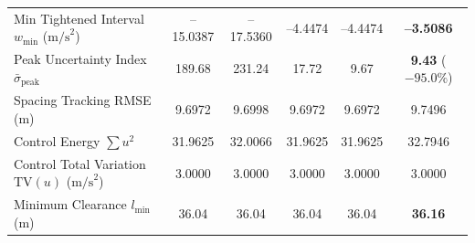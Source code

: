 \documentclass[journal]{IEEEtran}
\begin{document}
\begin{table}[t]
\begin{tabular}{lccccc}
Min Tightened Interval $w_{\min}$ ($\text{m/s}^2$) & --15.0387 & --17.5360 & --4.4474 & --4.4474 & \textbf{--3.5086} \\
Peak Uncertainty Index $\bar\sigma_{\mathrm{peak}}$ & 189.68 & 231.24 & 17.72 & 9.67 & \textbf{9.43} ($-95.0\%$) \\
Spacing Tracking RMSE (m) & 9.6972 & 9.6998 & 9.6972 & 9.6972 & 9.7496 \\
Control Energy $\sum u^2$ & 31.9625 & 32.0066 & 31.9625 & 31.9625 & 32.7946 \\
Control Total Variation $\mathrm{TV}(u)$ ($\text{m/s}^2$) & 3.0000 & 3.0000 & 3.0000 & 3.0000 & 3.0000 \\
Minimum Clearance $l_{\min}$ (m) & 36.04 & 36.04 & 36.04 & 36.04 & \textbf{36.16} \\
\bottomrule
\end{tabular}
\end{table}
\end{document}
